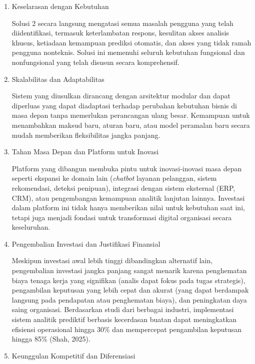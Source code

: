 \begin{enumerate}
    \item Keselarasan dengan Kebutuhan
    
    Solusi 2 secara langsung mengatasi semua masalah pengguna yang telah diidentifikasi, termasuk keterlambatan respons, kesulitan akses analisis khusus, ketiadaan kemampuan prediksi otomatis, dan akses yang tidak ramah pengguna nonteknis. Solusi ini memenuhi seluruh kebutuhan fungsional dan nonfungsional yang telah disusun secara komprehensif.
    
    \item Skalabilitas dan Adaptabilitas
    
    Sistem yang diusulkan dirancang dengan arsitektur modular dan dapat diperluas yang dapat diadaptasi terhadap perubahan kebutuhan bisnis di masa depan tanpa memerlukan perancangan ulang besar. Kemampuan untuk menambahkan maksud baru, aturan baru, atau model peramalan baru secara mudah memberikan fleksibilitas jangka panjang.
    
    \item Tahan Masa Depan dan Platform untuk Inovasi
    
    Platform yang dibangun membuka pintu untuk inovasi-inovasi masa depan seperti ekspansi ke domain lain (\textit{chatbot} layanan pelanggan, sistem rekomendasi, deteksi penipuan), integrasi dengan sistem eksternal (ERP, CRM), atau pengembangan kemampuan analitik lanjutan lainnya. Investasi dalam platform ini tidak hanya memberikan nilai untuk kebutuhan saat ini, tetapi juga menjadi fondasi untuk transformasi digital organisasi secara keseluruhan.
    
    \item Pengembalian Investasi dan Justifikasi Finansial
    
    Meskipun investasi awal lebih tinggi dibandingkan alternatif lain, pengembalian investasi jangka panjang sangat menarik karena penghematan biaya tenaga kerja yang signifikan (analis dapat fokus pada tugas strategis), pengambilan keputusan yang lebih cepat dan akurat (yang dapat berdampak langsung pada pendapatan atau penghematan biaya), dan peningkatan daya saing organisasi. Berdasarkan studi dari berbagai industri, implementasi sistem analitik prediktif berbasis kecerdasan buatan dapat meningkatkan efisiensi operasional hingga 30\% dan mempercepat pengambilan keputusan hingga 85\% (Shah, 2025).
    
    \item Keunggulan Kompetitif dan Diferensiasi
    

\end{enumerate}
